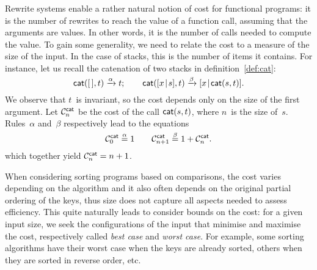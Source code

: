 
Rewrite systems enable a rather natural notion of cost for functional
programs: it is the number of rewrites to reach the value of a
function call, assuming that the arguments are values. In other words,
it is the number of calls needed to compute the value. To gain some
generality, we need to relate the cost to a measure of the size of the
input. In the case of stacks, this is the number of items it
contains. For instance, let us recall the catenation of two stacks in
definition~\eqref{def:cat}:
\begin{equation*}
\fun{cat}(        \el,t) \xrightarrow{\smash{\alpha}} t;\qquad
\fun{cat}(\cons{x}{s},t) \xrightarrow{\smash{\beta}}
\cons{x}{\fun{cat}(s,t)}.
\end{equation*}
We observe that \(t\)~is invariant, so the cost depends only on the
size of the first argument. Let
\(\C{\fun{cat}}{n}\) be the cost of the
call \(\fun{cat}(s,t)\), where \(n\)~is the
size of~\(s\). Rules~\(\alpha\) and~\(\beta\) respectively lead to the
equations
\begin{equation*}
\C{\fun{cat}}{0} \eqn{\smash{\alpha}} 1\qquad
\C{\fun{cat}}{n+1} \eqn{\smash{\beta}} 1 + \C{\fun{cat}}{n}.
\end{equation*}
which together yield \(\C{\fun{cat}}{n} = n +
1\).\label{cost:cat}



When considering sorting programs based on comparisons, the cost
varies depending on the algorithm and it also often depends on the
original partial ordering of the keys, thus size does not capture all
aspects needed to assess efficiency. This quite naturally leads to
consider bounds on the cost: for a given input size, we seek the
configurations of the input that minimise and maximise the cost,
respectively called \emph{best case} and \emph{worst case}. For
example, some sorting algorithms have their worst case when the keys
are already sorted, others when they are sorted in reverse order, etc.


\label{par:mean_sort}

